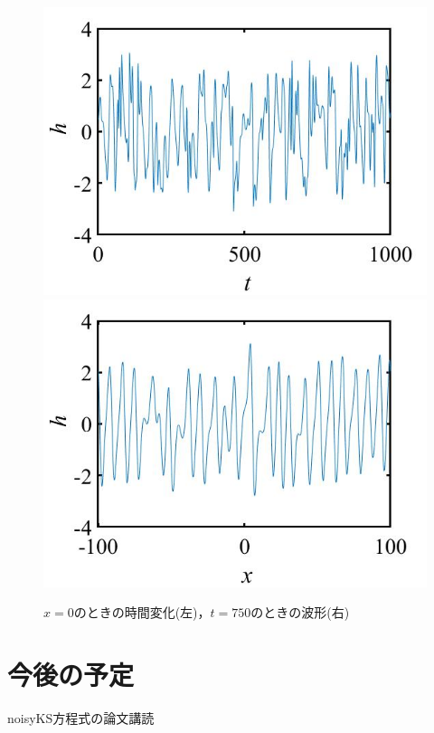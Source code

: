 \documentclass[autodetect-engine,dvipdfmx-if-dvi,ja=standard,a4paper,11pt]{bxjsarticle} %
\begin{document}
\begin{figure}[H]%
\begin{center}
\includegraphics[width=.4\textwidth]{x=0.jpg}
\includegraphics[width=.4\textwidth]{t=750.jpg}
\end{center}
\caption{$x=0$のときの時間変化(左)，$t=750$のときの波形(右)}%
\label{fig:xt}
\end{figure}

\section{今後の予定}
noisyKS方程式の論文講読\\



\end{document}
